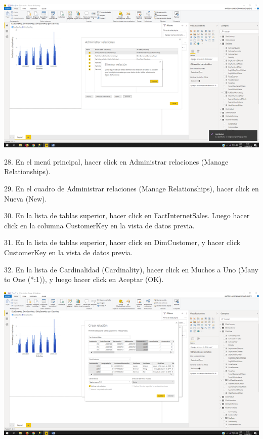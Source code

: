 \begin{center}
\includegraphics[width=15cm]{./Imagenes/img15} 
\end{center}
\item 28. En el menú principal, hacer click en Administrar relaciones (Manage Relationships).
\item 29. En el cuadro de Administrar relaciones (Manage Relationships), hacer click en Nueva (New).
\item 30. En la lista de tablas superior, hacer click en FactInternetSales. Luego hacer click en la columna CustomerKey en la vista de datos previa.
\item 31. En la lista de tablas superior, hacer click en DimCustomer, y hacer click CustomerKey en la vista de datos previa.
\item 32. En la lista de Cardinalidad (Cardinality), hacer click en Muchos a Uno (Many to One (*:1)), y luego hacer click en Aceptar (OK).

\begin{center}
\includegraphics[width=15cm]{./Imagenes/img16} 
\end{center}

